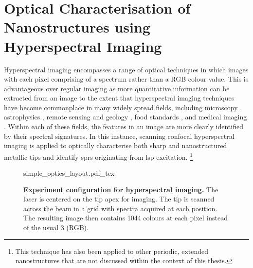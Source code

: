 \documentclass{article}
\begin{document}
\section{Optical Characterisation of Nanostructures using Hyperspectral Imaging}
\label{sec:hyperspectral_imaging}

Hyperspectral imaging encompasses a range of optical techniques in which images with each pixel comprising of a spectrum rather than a RGB colour value. This is advantageous over regular imaging as more quantitative information can be extracted from an image to the extent that hyperspectral imaging techniques have become commonplace in many widely spread fields, including microscopy \cite{schultz2001hyperspectral, leavesley2012hyperspectral}, astrophysics \cite{hege2004hyperspectral}, remote sensing and geology \cite{hackwell1996lwir, shaw2003spectral}, food standards \cite{kim2001hyperspectral, gowen2007hyperspectral}, and medical imaging \cite{vo2004hyperspectral, martin2006development, lu2014medical}. Within each of these fields, the features in an image are more clearly identified by their spectral signatures. In this instance, scanning confocal hyperspectral imaging is applied to optically characterise both sharp and nanostructured metallic tips and identify \glspl{spr} originating from \gls{lsp} excitation.%
\footnote{This technique has also been applied to other periodic, extended nanostructures that are not discussed within the context of this thesis.} %

\begin{figure}[bt]
\centering
\fontsize{10pt}{1em}\selectfont
\def\svgwidth{0.6\textwidth}
{simple_optics_layout.pdf_tex}
\caption[Experiment configuration for hyperspectral imaging]{\textbf{Experiment configuration for hyperspectral imaging.} The laser is centered on the tip apex for imaging. The tip is scanned across the beam in a grid with spectra acquired at each position. The resulting image then contains 1044 colours at each pixel instead of the usual 3 (RGB).}
\label{fig:simple_optics_layout}
\end{figure}
\end{document}
